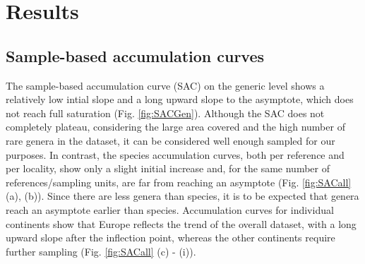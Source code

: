 \section{Results}


\subsection{Sample-based accumulation curves}
The sample-based accumulation curve (SAC) on the generic level shows a relatively low intial slope and a long upward slope to the asymptote, which does not reach full saturation (Fig. \ref{fig:SACGen}).
Although the SAC does not completely plateau, considering the large area covered and the high number of rare genera in the dataset, it can be considered well enough sampled for our purposes.
In contrast, the species accumulation curves, both per reference and per locality, show only a slight initial increase and, for the same number of references/sampling units, are far from reaching an asymptote (Fig. \ref{fig:SACall} (a), (b)).
Since there are less genera than species, it is to be expected that genera reach an asymptote earlier than species.
Accumulation curves for individual continents show that Europe reflects the trend of the overall dataset, with a long upward slope after the inflection point, whereas the other continents require further sampling (Fig. \ref{fig:SACall} (c) - (i)).


